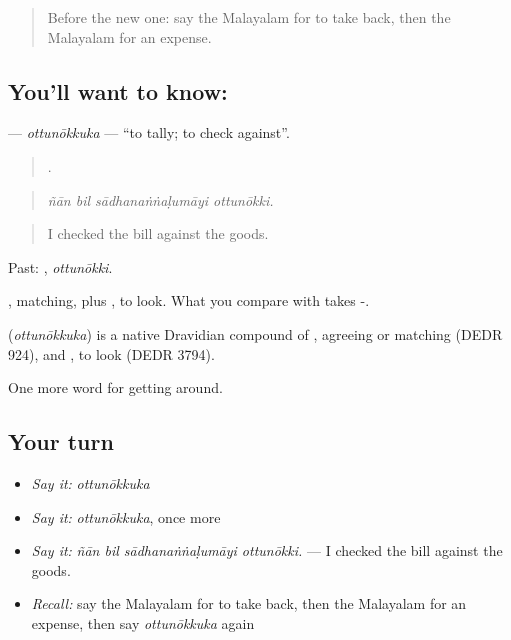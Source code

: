 \label{lesson:ML-C494-ottunokkuka}



\begin{quote}
Before the new one: say the Malayalam for to take back, then the Malayalam for an expense.
\end{quote}

\subsection*{You'll want to know: }
\textbf{} — \emph{ottunōkkuka} — \textquotedblleft{}to tally; to check against\textquotedblright{}.

\begin{quote}
   .
\end{quote}

\begin{quote}
\emph{ñān bil sādhanaṅṅaḷumāyi ottunōkki.}
\end{quote}

\begin{quote}
I checked the bill against the goods.
\end{quote}

Past: , \emph{ottunōkki}.

, matching, plus , to look. What you compare with takes -.

\begin{cousinweb}
\textbf{} (\emph{ottunōkkuka}) is a native Dravidian compound of , agreeing or matching (DEDR 924), and , to look (DEDR 3794).
\end{cousinweb}

\begin{grammarlens}[title={What you've built}]
One more word for getting around.
\end{grammarlens}

\subsection*{Your turn}
\begin{itemize}
\raggedright
  \item \emph{Say it:} \emph{ottunōkkuka}
  \item \emph{Say it:} \emph{ottunōkkuka}, once more
  \item \emph{Say it:} \emph{ñān bil sādhanaṅṅaḷumāyi ottunōkki.} — I checked the bill against the goods.
  \item \emph{Recall:} say the Malayalam for to take back, then the Malayalam for an expense, then say \emph{ottunōkkuka} again
\end{itemize}


